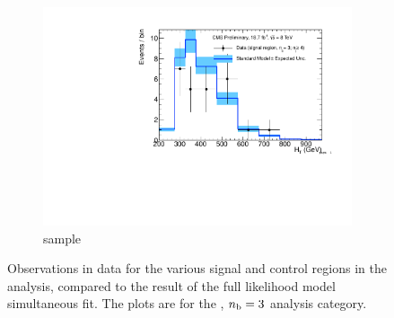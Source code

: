 \begin{figure}[h!]
\begin{subfigure}[b]{0.48\textwidth}
    \includegraphics[width=\textwidth,page=4]
    {Figs/results/v0/blueBand/bestFit_2012dev_RQcdZero_fZinvAll_3b_ge4j-1h_smOnly}
    \caption{\mj sample}
  \end{subfigure}
  \caption{Observations in data for the various signal and control
  regions in the analysis, compared to the result of the full likelihood model
  simultaneous fit. The plots are for the \njhigh, $n_{\text{b}} = 3$ analysis category.}
  \label{fig:blue_fits_3b_ge4j}
\end{figure}

